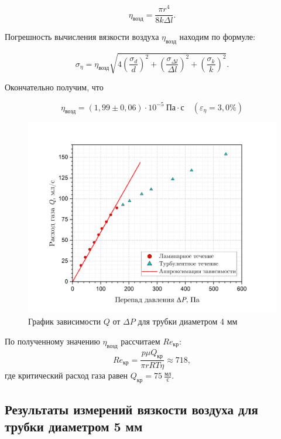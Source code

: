 \documentclass[a4paper, 12pt]{article}
\begin{document}
    \begin{equation}
        \label{eta}
        \eta_\text{возд} = \frac{\pi r^4}{8 k\Delta l}.
    \end{equation}

    \noindent Погрешность вычисления вязкости воздуха $\eta_\text{возд}$ находим по формуле:

    \begin{equation}
        \label{error_eta}
        \sigma_{\eta} = \eta_\text{возд} \sqrt{4\left( \frac{\sigma_d}{d} \right)^2 + \left( \frac{\sigma_{\Delta l}}{\Delta l} \right)^2 + \left( \frac{\sigma_k}{k} \right)^2}.
    \end{equation}

    \noindent Окончательно получим, что
    
    \[ \boxed{\eta_\text{возд} = \left(1,99 \pm 0,06\right) \cdot 10^{-5} \: \text{Па}\cdot \text{с} \quad \left( \varepsilon_{\eta} = 3,0 \% \right)} \]

    \begin{figure}[H]
        \centering
        \includegraphics[width = 15cm]{images/graph_4mm.png}
        \caption{График зависимости $Q$ от $\Delta P$ для трубки диаметром 4 мм}
        \label{p(q)_4mm}
    \end{figure}

    \noindent По полученному значению $\eta_\text{возд}$ рассчитаем $Re_\text{кр}$: \[ Re_\text{кр} = \frac{p\mu Q_\text{кр}}{\pi r RT\eta} \approx 718, \] где критический расход газа равен $Q_\text{кр} = 75 \: \frac{\text{мл}}{\text{с}}$.

    \subsection*{Результаты измерений вязкости воздуха для трубки диаметром 5 мм}
\end{document}
